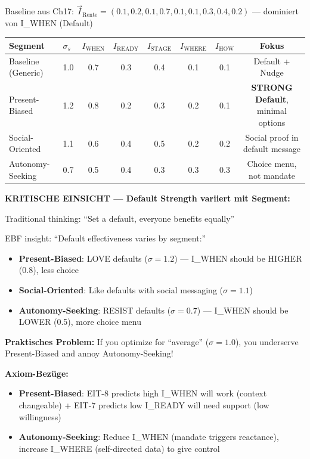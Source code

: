 Baseline aus Ch17: $\vec{I}_{\text{Rente}} = (0.1, 0.2, 0.1, 0.7, 0.1, 0.1, 0.3, 0.4, 0.2)$ — dominiert von I_WHEN (Default)

\begin{center}
\small
\renewcommand{\arraystretch}{1.3}
\begin{tabular}{@{}llcccccc@{}}
\toprule
\textbf{Segment} & \textbf{$\sigma_s$} & $I_{\text{WHEN}}$ & $I_{\text{READY}}$ & $I_{\text{STAGE}}$ & $I_{\text{WHERE}}$ & $I_{\text{HOW}}$ & \textbf{Fokus} \\
\midrule
Baseline (Generic) & 1.0 & 0.7 & 0.3 & 0.4 & 0.1 & 0.1 & Default + Nudge \\
Present-Biased & 1.2 & 0.8 & 0.2 & 0.3 & 0.2 & 0.1 & \textbf{STRONG Default}, minimal options \\
Social-Oriented & 1.1 & 0.6 & 0.4 & 0.5 & 0.2 & 0.2 & Social proof in default message \\
Autonomy-Seeking & 0.7 & 0.5 & 0.4 & 0.3 & 0.3 & 0.3 & Choice menu, not mandate \\
\bottomrule
\end{tabular}
\end{center}

\textbf{KRITISCHE EINSICHT --- Default Strength variiert mit Segment:}

\begin{tcolorbox}[colback=red!5!white, colframe=red!75!black, title=\textbf{Der Default ist kein One-Size-Fits-All}]

Traditional thinking: ``Set a default, everyone benefits equally''

EBF insight: ``Default effectiveness varies by segment:''

\begin{itemize}[nosep]
\item \textbf{Present-Biased}: LOVE defaults ($\sigma = 1.2$) — I_WHEN should be HIGHER (0.8), less choice
\item \textbf{Social-Oriented}: Like defaults with social messaging ($\sigma = 1.1$)
\item \textbf{Autonomy-Seeking}: RESIST defaults ($\sigma = 0.7$) — I_WHEN should be LOWER (0.5), more choice menu
\end{itemize}

\textbf{Praktisches Problem:} If you optimize for ``average'' ($\sigma = 1.0$), you underserve Present-Biased and annoy Autonomy-Seeking!

\end{tcolorbox}

\textbf{Axiom-Bezüge:}
\begin{itemize}[nosep]
\item \textbf{Present-Biased}: EIT-8 predicts high I_WHEN will work (context changeable) + EIT-7 predicts low I_READY will need support (low willingness)
\item \textbf{Autonomy-Seeking}: Reduce I_WHEN (mandate triggers reactance), increase I_WHERE (self-directed data) to give control
\end{itemize}

